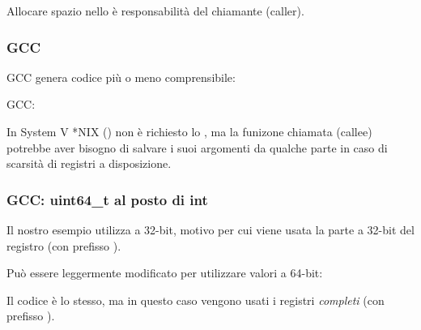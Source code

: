 Allocare spazio nello  è responsabilità del chiamante (\gls{caller}).

\subsubsection{GCC}

\Optimizing GCC genera codice più o meno comprensibile:



\NonOptimizing GCC:




In System V *NIX (\SysVABI) non è richiesto lo , ma la funizone chiamata (\gls{callee}) potrebbe aver bisogno di salvare
i suoi argomenti da qualche parte in caso di scarsità di registri a disposizione.

\subsubsection{GCC: uint64\_t al posto di int}

Il nostro esempio utilizza \Tint a 32-bit, motivo per cui viene usata la parte a 32-bit del registro (con prefisso ).

Può essere leggermente modificato per utilizzare valori a 64-bit:





Il codice è lo stesso, ma in questo caso vengono usati i registri \emph{completi} (con prefisso ).
